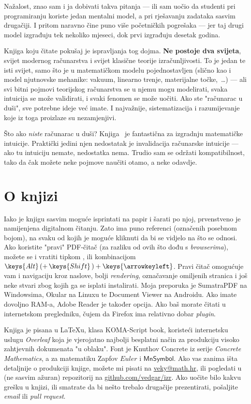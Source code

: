 Nažalost, znao sam i ja dobivati takva pitanja --- ili sam uočio da studenti pri programiranju koriste jedan mentalni model, a pri rješavanju zadataka sasvim drugačiji. I pritom naravno čine puno više početničkih pogrešaka --- jer taj drugi model izgrađuju tek nekoliko mjeseci, dok prvi izgrađuju desetak godina.

Knjiga koju čitate pokušaj je ispravljanja tog dojma. \textbf{Ne postoje dva svijeta}, svijet modernog računarstva i svijet klasične teorije izračunljivosti. To je jedan te isti svijet, samo što je u matematičkom modelu pojednostavljen (slično kao i model njutnovske mehanike: vakuum, linearno trenje, materijalne točke,~\ldots) --- ali svi bitni pojmovi teorijskog računarstva se u njemu mogu modelirati, svaka intuicija se može validirati, i svaki fenomen se može uočiti. Ako ste "računarac u duši", sve potrebne ideje već imate. I najvažnije, sistematizacija i razumijevanje koje iz toga proizlaze su nezamjenjivi.

Što ako \emph{niste} računarac u duši? Knjiga~\cite{skr:Vuk} je fantastična za izgradnju matematičke intuicije. Praktički jedini njen nedostatak je invalidacija računarske intuicije --- ako tu intuiciju nemate, nedostatka nema. Trudio sam se održati kompatibilnost, tako da čak možete neke pojmove naučiti otamo, a neke odavdje.

\section{O knjizi}

Iako je knjigu sasvim moguće isprintati na papir i šarati po njoj, prvenstveno je namijenjena digitalnom čitanju. Zato ima puno referenci (označenih posebnom bojom), na svaku od kojih je moguće kliknuti da bi se vidjelo na što se odnosi. Ako koristite "pravi" PDF-čitač (za razliku od ovih što dođu s \emph{browserima}), možete se i vratiti tipkom \keys{\!$\Mapsfrom$}, ili kombinacijom $\keys{Alt}\,(+\,\keys{Shift}\,)+\keys{\arrowkeyleft}$. Pravi čitač omogućuje vam i navigaciju kroz naslove, bolji \emph{rendering}, označavanje omiljenih stranica i još neke stvari zbog kojih ga se isplati instalirati. Moja preporuka je \textsf{SumatraPDF} na Windowsima, \textsf{Okular} na Linuxu te \textsf{Document Viewer} na Androidu. Ako imate dovoljno RAM-a, \textsf{Adobe Reader} je također opcija. Ako baš morate čitati u internetskom pregledniku, čujem da \textsf{Firefox} ima relativno dobar \emph{plugin}.

Knjiga je pisana u \textsf{\LaTeX{}}u, klasa \textsf{KOMA-Script book}, koristeći internetsku uslugu \emph{Overleaf} koja je vjerojatno najbolji besplatni način za produkciju visoko zahtjevnih dokumenata "u oblaku". Font je Knuthov Concrete iz serije \emph{Concrete Mathematics}, a za matematiku Zapfov \AmS{} $Euler$ i $\mathsf{MnSymbol}$. Ako vas zanima išta detaljnije o produkciji knjige, možete mi pisati na \href{mailto:veky@math.hr}{veky@math.hr}, ili pogledati u (ne sasvim ažuran) repozitorij na \href{https://github.com/vedgar/izr}{github.com/vedgar/izr}. Ako uočite bilo kakvu grešku u knjizi, ili smatrate da bi nešto trebalo drugačije prezentirati, pošaljite \emph{email} ili \emph{pull request}.

